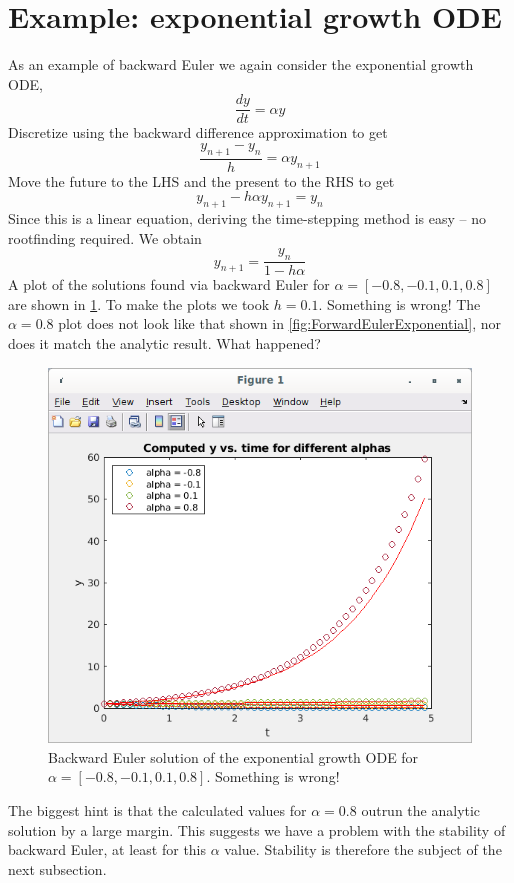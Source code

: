 \documentclass[hidelinks,notitlepage]{book}
\begin{document}
\section{Example: exponential growth ODE}
\label{sect:BkwdEulerExponentialGrowthODE}
As an example of backward Euler we again consider the exponential growth ODE,
\begin{equation}
\label{eq:ExpGrowthODE}
\frac{d y}{d t} = \alpha y
\end{equation}
Discretize using the backward difference approximation to get
\begin{equation}
\nonumber
\frac{y_{n+1} - y_n}{h} = \alpha y_{n+1}
\end{equation}
Move the future to the LHS and the present to the RHS to get
\begin{equation}
\nonumber
y_{n+1} - h \alpha y_{n+1} = y_n
\end{equation}
Since this is a linear equation, deriving the time-stepping method is easy -- no rootfinding required.  We obtain
\begin{equation}
\label{eq:BackwardEulerIterationLinearEq}
y_{n+1}= \frac{y_n}{1  - h \alpha }
\end{equation}
A plot of the solutions found via backward Euler for $\alpha = [-0.8, -0.1, 0.1, 0.8]$ are shown in \cref{fig:BackwardEulerExponential}.  To make the plots we took $h = 0.1$.  Something is wrong!  The $\alpha = 0.8$ plot does not look like that shown in \cref{fig:ForwardEulerExponential}, nor does it match the analytic result.  What happened?
\begin{figure}[tbh]
	\centering
	\includegraphics[width=0.5\columnwidth]{BackwardEulerExponential.png}
	\caption{Backward Euler solution of the exponential growth ODE for  $\alpha = [-0.8, -0.1, 0.1, 0.8]$.  Something is wrong!}
	\label{fig:BackwardEulerExponential}
\end{figure}
The biggest hint is that the calculated values for $\alpha = 0.8$ outrun the analytic solution by a large margin.  This suggests we have a problem with the stability of backward Euler, at least for this $\alpha$ value.  Stability is therefore the subject of the next subsection.
\end{document}
